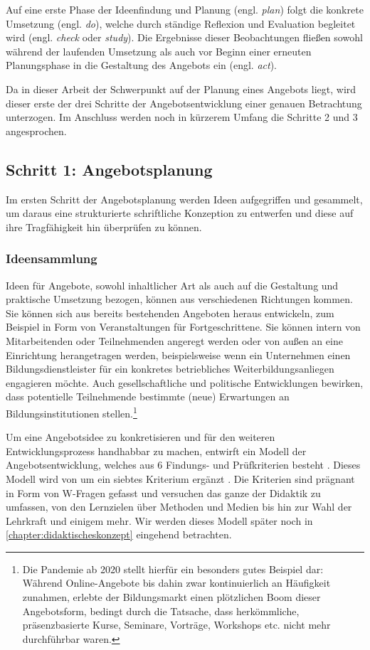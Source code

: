 \documentclass[
  twoside,
  parskip=half-,
  paper=176mm:246mm,
  BCOR=14mm,
  DIV=14,
]{scrreprt}
\begin{document}
Auf eine erste Phase der Ideenfindung und Planung (engl. \textit{plan}) folgt die konkrete Umsetzung (engl. \textit{do}), welche durch ständige Reflexion und Evaluation begleitet wird (engl. \textit{check} oder \textit{study}). Die Ergebnisse dieser Beobachtungen fließen sowohl während der laufenden Umsetzung als auch vor Beginn einer erneuten Planungsphase in die Gestaltung des Angebots ein (engl. \textit{act}).

Da in dieser Arbeit der Schwerpunkt auf der Planung eines Angebots liegt, wird dieser erste der drei Schritte der Angebotsentwicklung einer genauen Betrachtung unterzogen. Im Anschluss werden noch in kürzerem Umfang die Schritte 2 und 3 angesprochen.

\subsection{Schritt 1: Angebotsplanung}

Im ersten Schritt der Angebotsplanung werden Ideen aufgegriffen und gesammelt, um daraus eine strukturierte schriftliche Konzeption zu entwerfen und diese auf ihre Tragfähigkeit hin überprüfen zu können.

\subsubsection{Ideensammlung} Ideen für Angebote, sowohl inhaltlicher Art als auch auf die Gestaltung und praktische Umsetzung bezogen, können aus verschiedenen Richtungen kommen. Sie können sich aus bereits bestehenden Angeboten heraus entwickeln, zum Beispiel in Form von Veranstaltungen für Fortgeschrittene. Sie können intern von Mitarbeitenden oder Teilnehmenden angeregt werden oder von außen an eine Einrichtung herangetragen werden, beispielsweise wenn ein Unternehmen einen Bildungsdienstleister für ein konkretes betriebliches Weiterbildungsanliegen engagieren möchte. Auch gesellschaftliche und politische Entwicklungen bewirken, dass potentielle Teilnehmende bestimmte (neue) Erwartungen an Bildungsinstitutionen stellen.\footnote{Die Pandemie ab 2020 stellt hierfür ein besonders gutes Beispiel dar: Während Online-Angebote bis dahin zwar kontinuierlich an Häufigkeit zunahmen, erlebte der Bildungsmarkt einen plötzlichen Boom dieser Angebotsform, bedingt durch die Tatsache, dass herkömmliche, präsenzbasierte Kurse, Seminare, Vorträge, Workshops etc. nicht mehr durchführbar waren.}

Um eine Angebotsidee zu konkretisieren und für den weiteren Entwicklungsprozess handhabbar zu machen, entwirft \citeauthor{schlutz} ein Modell der Angebotsentwicklung, welches aus 6 Findungs- und Prüfkriterien besteht \autocite[vgl.][78]{schlutz}. Dieses Modell wird von \citeauthor{fleige} um ein siebtes Kriterium ergänzt \autocite[vgl.][127]{fleige}. Die Kriterien sind prägnant in Form von W-Fragen gefasst und versuchen das ganze  der Didaktik zu umfassen, von den Lernzielen über Methoden und Medien bis hin zur Wahl der Lehrkraft und einigem mehr. Wir werden dieses Modell später noch in \autoref{chapter:didaktischeskonzept} eingehend betrachten.
\end{document}
